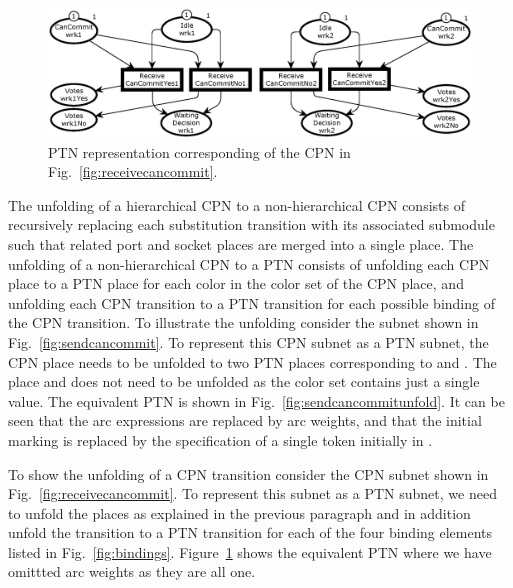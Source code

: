 \begin{figure}[t!!!!!]
\centering
\includegraphics[scale=.45]{figures/PTReceiveCanCommitBoth.eps}
\caption{PTN representation corresponding of the CPN in Fig.~\ref{fig:receivecancommit}.}
\label{fig:receivecancommitunfold}
\end{figure}


The unfolding of a hierarchical CPN to a non-hierarchical CPN consists
of recursively replacing each substitution transition with its
associated submodule such that related port and socket places are
merged into a single place. The unfolding of a non-hierarchical CPN to
a PTN consists of unfolding each CPN place to a PTN place for each
color in the color set of the CPN place, and unfolding each CPN
transition to a PTN transition for each possible binding of the CPN
transition.  To illustrate the unfolding consider the subnet shown in
Fig.~\ref{fig:sendcancommit}. To represent this CPN subnet as a PTN
subnet, the CPN place  needs to be unfolded to two
PTN places corresponding to  and . The
place  and  does not need to be
unfolded as the  color set contains just a single
value. The equivalent PTN is shown in
Fig.~\ref{fig:sendcancommitunfold}. It can be seen that the arc
expressions are replaced by arc weights, and that the initial marking
is replaced by the specification of a single token initially in
. 


To show the unfolding of a CPN transition consider the
CPN subnet shown in Fig.~\ref{fig:receivecancommit}. To represent this
subnet as a PTN subnet, we need to unfold the places as explained in
the previous paragraph and in addition unfold the transition
 to a PTN transition for each of the four
binding elements listed in
Fig.~\ref{fig:bindings}. Figure~\ref{fig:receivecancommitunfold} shows
the equivalent PTN where we have omittted arc weights as they are all
one.


